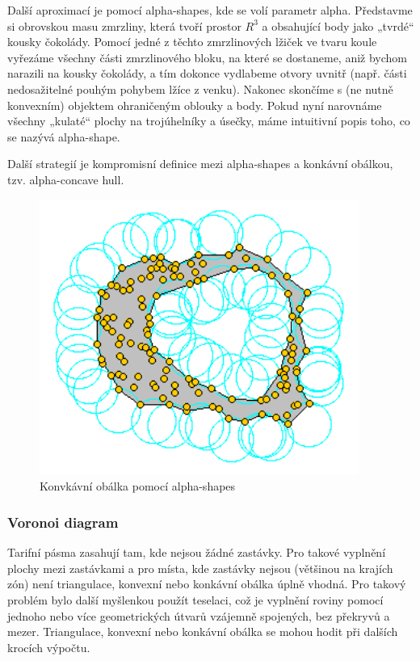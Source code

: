 Další aproximací je pomocí alpha-shapes, kde se volí parametr alpha. Představme si obrovskou masu zmrzliny,
která tvoří prostor \(R^3\) a obsahující body jako „tvrdé“ kousky čokolády. Pomocí jedné z těchto 
zmrzlinových lžiček ve tvaru koule vyřezáme všechny části zmrzlinového bloku, na které se dostaneme,
aniž bychom narazili na kousky čokolády, a tím dokonce vydlabeme otvory uvnitř 
(např. části nedosažitelné pouhým pohybem lžíce z venku). Nakonec skončíme s 
(ne nutně konvexním) objektem ohraničeným oblouky a body. Pokud nyní narovnáme všechny 
„kulaté“ plochy na trojúhelníky a úsečky, máme intuitivní popis toho, co se nazývá alpha-shape. \cite{alpha-shapes}

Další strategií je kompromisní definice mezi alpha-shapes a konkávní obálkou, tzv. alpha-concave
hull. 

\begin{figure}[H] \centering
    \includegraphics[width=296pt]{./pictures/alphashape.png}
    \caption[Konvkávní obálka pomocí alpha-shapes]{Konvkávní obálka pomocí alpha-shapes \cite{alpha-shapes-picture}}
	\label{fig:alpha-shapes-picture}              
\end{figure} 

\subsubsection{Voronoi diagram}

Tarifní pásma zasahují tam, kde nejsou žádné zastávky. Pro takové vyplnění plochy
mezi zastávkami a pro místa, kde zastávky nejsou (většinou na krajích zón) není triangulace, konvexní nebo konkávní 
obálka úplně vhodná. Pro takový problém bylo další myšlenkou použít teselaci, což je vyplnění roviny pomocí jednoho
nebo více geometrických útvarů vzájemně spojených, bez překryvů a mezer. Triangulace, konvexní nebo konkávní 
obálka se mohou hodit při dalších krocích výpočtu.

